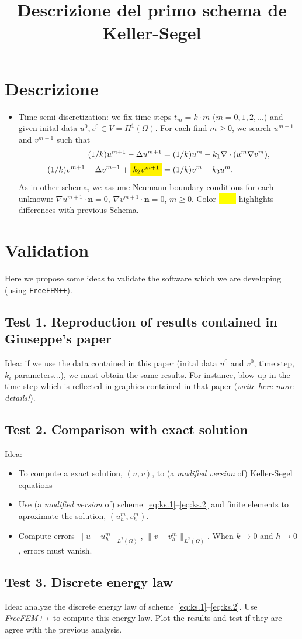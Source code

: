 \documentclass[a4wide]{article}
\title{Descrizione del primo schema de Keller-Segel}
\newcommand{\um}{u^m}
\newcommand{\umm}{u^{m+1}}
\newcommand{\vm}{v^m}
\newcommand{\vmm}{v^{m+1}}
\newcommand{\grad}{\nabla}
\renewcommand{\div}{\nabla\cdot}
\newcommand{\nn}{\mathbf{n}}
\newcommand{\hm}[1]{\colorbox{yellow}{\ensuremath{#1}}}
\begin{document}
\maketitle

\section{Descrizione}

\begin{itemize}
\item Time
  semi-discretization: we fix time steps $t_m=k\cdot m$
  ($m=0,1,2,...$) and given inital data $u^0,v^0 \in
  V=H^1(\Omega)$.
  For each find $m\ge 0$, we search $\umm$ and $\vmm$ such that
  \begin{align}
    \label{eq:ks.1}
    (1/k) \umm - \Delta \umm &= (1/k) \um - k_1 \div(\um \grad \vm),
    \\
    \label{eq:ks.2}
    (1/k) \vmm - \Delta \vmm + \hm{k_2 \vmm} &= (1/k) \vm + k_3 \um.
  \end{align}
  As in other schema, we assume Neumann boundary conditions for each unknown:
  $\grad \umm \cdot \nn=0$, $\grad \vmm \cdot \nn=0$, $m\ge 0$.
  Color \hm{\qquad\rule{0pt}{1ex}} highlights differences with previous Schema.
\end{itemize}

\section{Validation}
Here we propose some ideas to validate the software
which we are developing (using \texttt{FreeFEM++}).

\subsection*{Test 1. Reproduction of results contained in Giuseppe's paper}

Idea: if we use the data contained in this paper (inital data $u^0$
and $v^0$, time step, $k_i$ parameters...), we must obtain the same
results. For instance, blow-up in the time step which is reflected in
graphics contained in that paper (\textit{write here more details!}).

\subsection*{Test 2. Comparison with exact solution}

Idea:
\begin{itemize}
\item To compute a exact solution, $(u,v)$, to (a \textit{modified version} of)
  Keller-Segel equations
\item Use (a \textit{modified version} of)
  scheme~\eqref{eq:ks.1}--\eqref{eq:ks.2} and finite elements to
  aproximate the solution, $(\um_h, \vm_h)$.
\item Compute errors $\|u-\um_h\|_{L^2(\Omega)}$,
  $\|v-\vm_h\|_{L^2(\Omega)}$. When $k\to 0$ and $h\to 0$, errors must
  vanish.
\end{itemize}

\subsection*{Test 3. Discrete energy law}

Idea: analyze the discrete energy law of
scheme~\eqref{eq:ks.1}--\eqref{eq:ks.2}. Use \textit{FreeFEM++} to
compute this energy law. Plot the results and test if they are
agree with the previous analysis.
\end{document}
